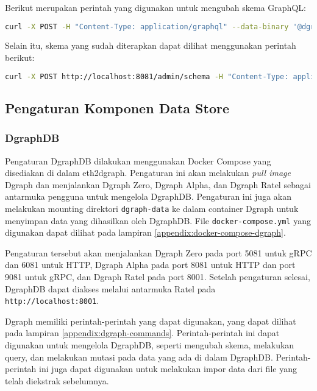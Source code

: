 Berikut merupakan perintah yang digunakan untuk mengubah skema GraphQL:

\begin{lstlisting}[language=bash]
    curl -X POST -H "Content-Type: application/graphql" --data-binary '@dgraph/simple.graphql' http://localhost:8081/admin/schema
\end{lstlisting}

Selain itu, skema yang sudah diterapkan dapat dilihat menggunakan perintah berikut:

\begin{lstlisting}[language=bash]
    curl -X POST http://localhost:8081/admin/schema -H "Content-Type: application/json" -d '{"query": "{ getGQLSchema { schema } }"}'
\end{lstlisting}

\subsection{Pengaturan Komponen Data Store}

\subsubsection{DgraphDB}

Pengaturan DgraphDB dilakukan menggunakan Docker Compose yang disediakan di dalam eth2dgraph. Pengaturan ini akan melakukan \textit{pull image} Dgraph dan menjalankan Dgraph Zero, Dgraph Alpha, dan Dgraph Ratel sebagai antarmuka pengguna untuk mengelola DgraphDB. Pengaturan ini juga akan melakukan mounting direktori \texttt{dgraph-data} ke dalam container Dgraph untuk menyimpan data yang dihasilkan oleh DgraphDB. File \texttt{docker-compose.yml} yang digunakan dapat dilihat pada lampiran \ref{appendix:docker-compose-dgraph}.

Pengaturan tersebut akan menjalankan Dgraph Zero pada port 5081 untuk gRPC dan 6081 untuk HTTP, Dgraph Alpha pada port 8081 untuk HTTP dan port 9081 untuk gRPC, dan Dgraph Ratel pada port 8001. Setelah pengaturan selesai, DgraphDB dapat diakses melalui antarmuka Ratel pada \texttt{http://localhost:8001}.

Dgraph memiliki perintah-perintah yang dapat digunakan, yang dapat dilihat pada lampiran \ref{appendix:dgraph-commands}. Perintah-perintah ini dapat digunakan untuk mengelola DgraphDB, seperti mengubah skema, melakukan query, dan melakukan mutasi pada data yang ada di dalam DgraphDB. Perintah-perintah ini juga dapat digunakan untuk melakukan impor data dari file yang telah diekstrak sebelumnya.


